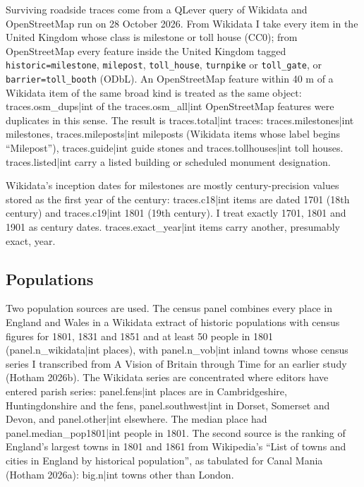 \documentclass[11pt,a4paper]{article}
\begin{document}
Surviving roadside traces come from a QLever query of Wikidata and OpenStreetMap run on 28 October 2026. From Wikidata I take every item in the United Kingdom whose class is milestone or toll house (CC0); from OpenStreetMap every feature inside the United Kingdom tagged \texttt{historic=milestone}, \texttt{milepost}, \texttt{toll\_house}, \texttt{turnpike} or \texttt{toll\_gate}, or \texttt{barrier=toll\_booth} (ODbL). An OpenStreetMap feature within 40 m of a Wikidata item of the same broad kind is treated as the same object: {{traces.osm_dups|int}} of the {{traces.osm_all|int}} OpenStreetMap features were duplicates in this sense. The result is {{traces.total|int}} traces: {{traces.milestones|int}} milestones, {{traces.mileposts|int}} mileposts (Wikidata items whose label begins ``Milepost''), {{traces.guide|int}} guide stones and {{traces.tollhouses|int}} toll houses. {{traces.listed|int}} carry a listed building or scheduled monument designation.

Wikidata's inception dates for milestones are mostly century-precision values stored as the first year of the century: {{traces.c18|int}} items are dated 1701 (18th century) and {{traces.c19|int}} 1801 (19th century). I treat exactly 1701, 1801 and 1901 as century dates. {{traces.exact_year|int}} items carry another, presumably exact, year.

\subsection{Populations}

Two population sources are used. The census panel combines every place in England and Wales in a Wikidata extract of historic populations with census figures for 1801, 1831 and 1851 and at least 50 people in 1801 ({{panel.n_wikidata|int}} places), with {{panel.n_vob|int}} inland towns whose census series I transcribed from A Vision of Britain through Time for an earlier study (Hotham 2026b). The Wikidata series are concentrated where editors have entered parish series: {{panel.fens|int}} places are in Cambridgeshire, Huntingdonshire and the fens, {{panel.southwest|int}} in Dorset, Somerset and Devon, and {{panel.other|int}} elsewhere. The median place had {{panel.median_pop1801|int}} people in 1801. The second source is the ranking of England's largest towns in 1801 and 1861 from Wikipedia's ``List of towns and cities in England by historical population'', as tabulated for Canal Mania (Hotham 2026a): {{big.n|int}} towns other than London.
\end{document}
